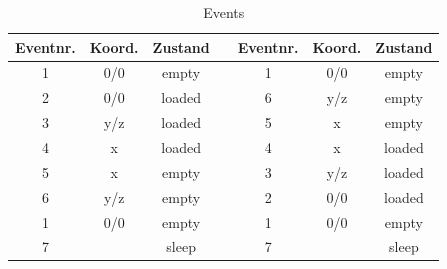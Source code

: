 \begin{table}[H]
  \caption{Events}
  \label{tab:event}
  \begin{center}   
    \begin{tabular}{ccc|c|ccc}
		Eventnr.&	Koord.&	Zustand & & Eventnr.&	Koord.&	Zustand\\
		\hline
		1 &			0/0 &	empty & & 1 &			0/0 	&empty\\
		2 &			0/0 &	loaded & & 6 &			y/z 	&empty\\
		3 &			y/z &	loaded & & 5 &			x 		&empty\\
		4 &			x 	&	loaded & & 4 &			x 		&loaded\\
		5 	&		x 	&	empty & & 3 &			y/z 	&loaded\\
		6 	&		y/z &	empty & & 2 &			0/0 	&loaded\\
		1	&		0/0	&	empty & & 1	&		0/0		&empty\\
		7 &					&sleep& & 7 &					&sleep\\
    \end{tabular}
  \end{center}
\end{table}
%	

